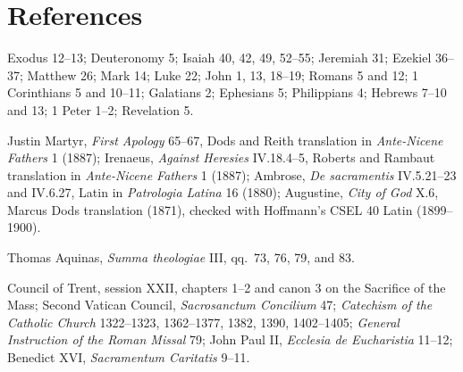 \section{References}

\begin{description}[style=nextline,leftmargin=0pt,labelsep=0pt]
\item[Scripture]
Exodus 12--13; Deuteronomy 5; Isaiah 40, 42, 49, 52--55; Jeremiah 31;
Ezekiel 36--37; Matthew 26; Mark 14; Luke 22; John 1, 13, 18--19;
Romans 5 and 12; 1 Corinthians 5 and 10--11; Galatians 2; Ephesians 5;
Philippians 4; Hebrews 7--10 and 13; 1 Peter 1--2; Revelation 5.

\item[Early Christian witnesses]
Justin Martyr, \emph{First Apology} 65--67, Dods and Reith translation in
\emph{Ante-Nicene Fathers} 1 (1887); Irenaeus, \emph{Against Heresies}
IV.18.4--5, Roberts and Rambaut translation in \emph{Ante-Nicene Fathers} 1
(1887); Ambrose, \emph{De sacramentis} IV.5.21--23 and IV.6.27, Latin in
\emph{Patrologia Latina} 16 (1880); Augustine, \emph{City of God} X.6, Marcus
Dods translation (1871), checked with Hoffmann's CSEL 40 Latin (1899--1900).

\item[Scholastic source]
Thomas Aquinas, \emph{Summa theologiae} III, qq.~73, 76, 79, and 83.

\item[Authoritative teaching]
Council of Trent, session XXII, chapters 1--2 and canon 3 on the Sacrifice of the
Mass; Second Vatican Council, \emph{Sacrosanctum Concilium} 47; \emph{Catechism
of the Catholic Church} 1322--1323, 1362--1377, 1382, 1390, 1402--1405;
\emph{General Instruction of the Roman Missal} 79; John Paul II,
\emph{Ecclesia de Eucharistia} 11--12; Benedict XVI, \emph{Sacramentum
Caritatis} 9--11.
\end{description}

